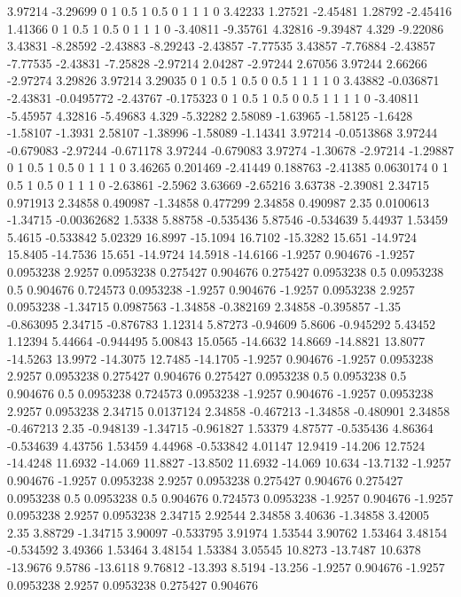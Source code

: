 3.97214 -3.29699
0 1
0.5 1
0.5 0
1 1
1 0
3.42233 1.27521
-2.45481 1.28792
-2.45416 1.41366
0 1
0.5 1
0.5 0
1 1
1 0
-3.40811 -9.35761
4.32816 -9.39487
4.329 -9.22086
3.43831 -8.28592
-2.43883 -8.29243
-2.43857 -7.77535
3.43857 -7.76884
-2.43857 -7.77535
-2.43831 -7.25828
-2.97214 2.04287
-2.97244 2.67056
3.97244 2.66266
-2.97274 3.29826
3.97214 3.29035
0 1
0.5 1
0.5 0
0.5 1
1 1
1 0
3.43882 -0.036871
-2.43831 -0.0495772
-2.43767 -0.175323
0 1
0.5 1
0.5 0
0.5 1
1 1
1 0
-3.40811 -5.45957
4.32816 -5.49683
4.329 -5.32282
2.58089 -1.63965
-1.58125 -1.6428
-1.58107 -1.3931
2.58107 -1.38996
-1.58089 -1.14341
3.97214 -0.0513868
3.97244 -0.679083
-2.97244 -0.671178
3.97244 -0.679083
3.97274 -1.30678
-2.97214 -1.29887
0 1
0.5 1
0.5 0
1 1
1 0
3.46265 0.201469
-2.41449 0.188763
-2.41385 0.0630174
0 1
0.5 1
0.5 0
1 1
1 0
-2.63861 -2.5962
3.63669 -2.65216
3.63738 -2.39081
2.34715 0.971913
2.34858 0.490987
-1.34858 0.477299
2.34858 0.490987
2.35 0.0100613
-1.34715 -0.00362682
1.5338 5.88758
-0.535436 5.87546
-0.534639 5.44937
1.53459 5.4615
-0.533842 5.02329
16.8997 -15.1094
16.7102 -15.3282
15.651 -14.9724
15.8405 -14.7536
15.651 -14.9724
14.5918 -14.6166
-1.9257 0.904676
-1.9257 0.0953238
2.9257 0.0953238
0.275427 0.904676
0.275427 0.0953238
0.5 0.0953238
0.5 0.904676
0.724573 0.0953238
-1.9257 0.904676
-1.9257 0.0953238
2.9257 0.0953238
-1.34715 0.0987563
-1.34858 -0.382169
2.34858 -0.395857
-1.35 -0.863095
2.34715 -0.876783
1.12314 5.87273
-0.94609 5.8606
-0.945292 5.43452
1.12394 5.44664
-0.944495 5.00843
15.0565 -14.6632
14.8669 -14.8821
13.8077 -14.5263
13.9972 -14.3075
12.7485 -14.1705
-1.9257 0.904676
-1.9257 0.0953238
2.9257 0.0953238
0.275427 0.904676
0.275427 0.0953238
0.5 0.0953238
0.5 0.904676
0.5 0.0953238
0.724573 0.0953238
-1.9257 0.904676
-1.9257 0.0953238
2.9257 0.0953238
2.34715 0.0137124
2.34858 -0.467213
-1.34858 -0.480901
2.34858 -0.467213
2.35 -0.948139
-1.34715 -0.961827
1.53379 4.87577
-0.535436 4.86364
-0.534639 4.43756
1.53459 4.44968
-0.533842 4.01147
12.9419 -14.206
12.7524 -14.4248
11.6932 -14.069
11.8827 -13.8502
11.6932 -14.069
10.634 -13.7132
-1.9257 0.904676
-1.9257 0.0953238
2.9257 0.0953238
0.275427 0.904676
0.275427 0.0953238
0.5 0.0953238
0.5 0.904676
0.724573 0.0953238
-1.9257 0.904676
-1.9257 0.0953238
2.9257 0.0953238
2.34715 2.92544
2.34858 3.40636
-1.34858 3.42005
2.35 3.88729
-1.34715 3.90097
-0.533795 3.91974
1.53544 3.90762
1.53464 3.48154
-0.534592 3.49366
1.53464 3.48154
1.53384 3.05545
10.8273 -13.7487
10.6378 -13.9676
9.5786 -13.6118
9.76812 -13.393
8.5194 -13.256
-1.9257 0.904676
-1.9257 0.0953238
2.9257 0.0953238
0.275427 0.904676
